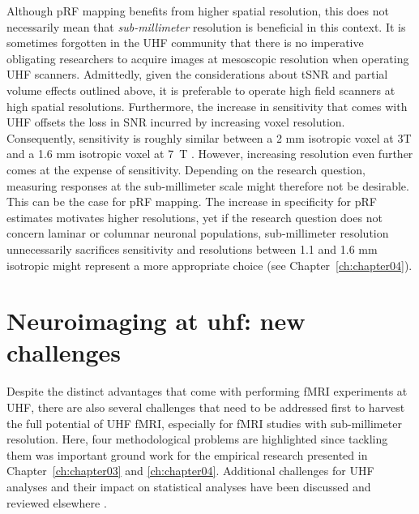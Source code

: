 Although pRF mapping benefits from higher spatial resolution, this does not necessarily mean that \textit{sub-millimeter} resolution is beneficial in this context. It is sometimes forgotten in the UHF community that there is no imperative obligating researchers to acquire images at mesoscopic resolution when operating UHF scanners. Admittedly, given the considerations about tSNR and partial volume effects outlined above, it is preferable to operate high field scanners at high spatial resolutions. Furthermore, the increase in sensitivity that comes with UHF offsets the loss in SNR incurred by increasing voxel resolution. Consequently, sensitivity is roughly similar between a 2 mm isotropic voxel at 3T and a 1.6 mm isotropic voxel at 7~T \parencite{DeMartino2016}. However, increasing resolution even further comes at the expense of sensitivity. Depending on the research question, measuring responses at the sub-millimeter scale might therefore not be desirable. This can be the case for pRF mapping. The increase in specificity for pRF estimates motivates higher resolutions, yet if the research question does not concern laminar or columnar neuronal populations, sub-millimeter resolution unnecessarily sacrifices sensitivity and resolutions between 1.1 and 1.6 mm isotropic might represent a more appropriate choice (see Chapter~\ref{ch:chapter04}).

\section{Neuroimaging at uhf: new challenges}
Despite the distinct advantages that come with performing fMRI experiments at UHF, there are also several challenges that need to be addressed first to harvest the full potential of UHF fMRI, especially for fMRI studies with sub-millimeter resolution. Here, four methodological problems are highlighted since tackling them was important ground work for the empirical research presented in Chapter~\ref{ch:chapter03} and \ref{ch:chapter04}. Additional challenges for UHF analyses and their impact on statistical analyses have been discussed and reviewed elsewhere \parencite{Polimeni2017, DeMartino2016}.

